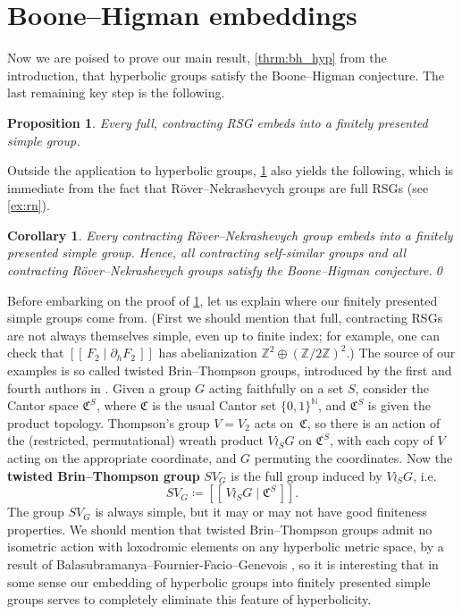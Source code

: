 \documentclass[11pt,letterpaper]{amsart}
\newtheorem{proposition}[theorem]{Proposition}
\newtheorem{corollary}[theorem]{Corollary}
\theoremstyle{definition}
\newcommand{\newword}[1]{\textbf{#1}}
\newcommand{\Z}{\mathbb{Z}}
\newcommand{\N}{\mathbb{N}}
\newcommand{\C}{\mathfrak{C}}
\begin{document}
\section{Boone--Higman embeddings}\label{sec:ending}

Now we are poised to prove our main result, \cref{thrm:bh_hyp} from the introduction, that hyperbolic groups satisfy the Boone--Higman conjecture. The last remaining key step is the following.

\begin{proposition}\label{prop:contr_to_simple}
Every full, contracting RSG embeds into a finitely presented simple group.
\end{proposition}

Outside the application to hyperbolic groups, \cref{prop:contr_to_simple} also yields the following, which is immediate from the fact that R\"over--Nekrashevych groups are full RSGs (see \cref{ex:rn}).

\begin{corollary}\label{cor:RN_BH}
Every contracting R\"over--Nekrashevych group embeds into a finitely presented simple group. Hence, all contracting self-similar groups and all contracting R\"over--Nekrashevych groups satisfy the Boone--Higman conjecture.\qed
\end{corollary}

Before embarking on the proof of \cref{prop:contr_to_simple}, let us explain where our finitely presented simple groups come from. (First we should mention that full, contracting RSGs are not always themselves simple, even up to finite index; for example, one can check that $[[\,F_2\mid \partial_h F_2\,]]$ has abelianization $\Z^2\oplus (\Z/2\Z)^2$.)  The source of our examples is so called twisted Brin--Thompson groups, introduced by the first and fourth authors in \cite{BelkZaremskyTwisted}. Given a group $G$ acting faithfully on a set $S$, consider the Cantor space $\C^S$, where $\C$ is the usual Cantor set $\{0,1\}^\N$, and $\C^S$ is given the product topology. Thompson's group $V=V_2$ acts on~$\C$, so there is an action of the (restricted, permutational) wreath product $V \wr_S G$ on $\C^S$, with each copy of $V$ acting on the appropriate coordinate, and $G$ permuting the coordinates. Now the \newword{twisted Brin--Thompson group} $SV_G$ is the full group induced by $V\wr_S G$, i.e.
\[
SV_G \coloneqq [[\,V\wr_S G \mid \C^S\,]].
\]
The group $SV_G$ is always simple, but it may or may not have good finiteness properties. We should mention that twisted Brin--Thompson groups admit no isometric action with loxodromic elements on any hyperbolic metric space, by a result of Balasubramanya--Fournier-Facio--Genevois \cite{BFFG}, so it is interesting that in some sense our embedding of hyperbolic groups into finitely presented simple groups serves to completely eliminate this feature of hyperbolicity.
\end{document}

